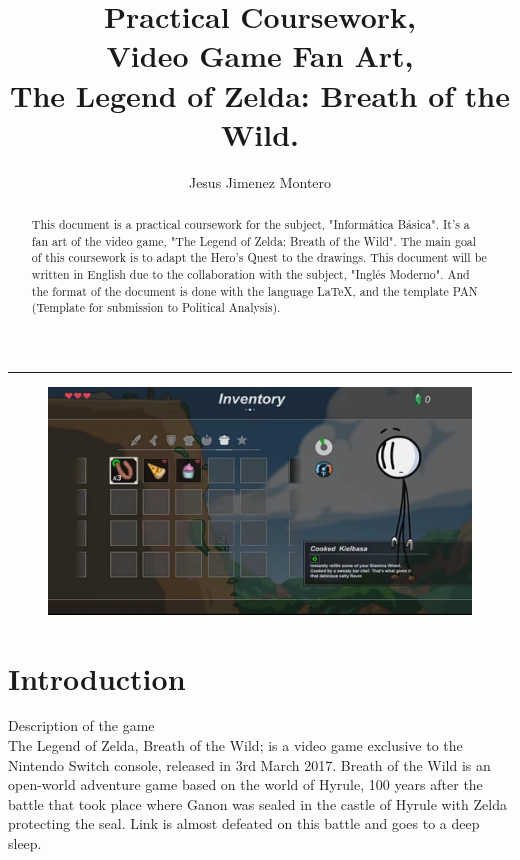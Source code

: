 \documentclass{cup-pan}
\title{Practical Coursework,\\ Video Game Fan Art, \\ The Legend of Zelda: Breath of the Wild.}
\author{Jesus Jimenez Montero}
\affil[1] {Informática Básica, VJ1202}
\affil[2] {Expresión Artística, VJ1204}
\affil[3] {Inglés Moderno, VJ1205}
\begin{document}
\maketitle
\textcolor{PANDarkBlue}{\hrule}

\medskip
\begin{figure}[H]
    \includegraphics[width=\textwidth]{Imagen de WhatsApp 2023-01-07 a las 23.12.05.jpg}
\end{figure}


\tableofcontents
\newpage
\listoffigures
\newpage

\begin{abstract}
    This document is a practical coursework for the subject, "Informática Básica". It's a fan art of the video game, "The Legend of Zelda: Breath of the Wild". The main goal of this coursework is to adapt the Hero's Quest to the drawings.
    This document will be written in English due to the collaboration with the subject, "Inglés Moderno". 
    And the format of the document is done with the language LaTeX, and the template PAN (Template for submission to Political Analysis).

\end{abstract}


\section{Introduction}

    \textcolor{PANDarkBlue}{\large Description of the game}\\
    
    The Legend of Zelda, Breath of the Wild; is a video game exclusive to the Nintendo Switch console, released in 3rd March 2017. 
    Breath of the Wild is an open-world adventure game based on the world of Hyrule, 100 years after the battle that took place where Ganon was sealed in the castle of Hyrule with Zelda protecting the seal. Link is almost defeated on this battle and goes to a deep sleep.
    
\end{document}
